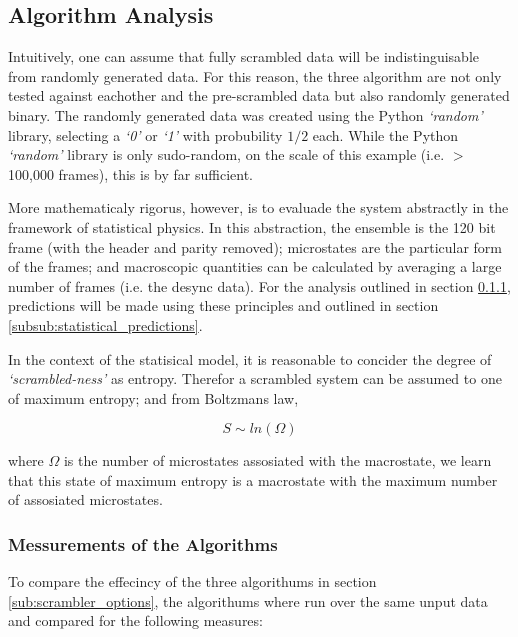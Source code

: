 	\subsection{Algorithm Analysis}

		Intuitively, one can assume that fully scrambled data will be indistinguisable from randomly generated data. 
		For this reason, the three algorithm are not only tested against eachother and the pre-scrambled data but also randomly generated binary.
		The randomly generated data was created using the Python \textit{`random'} library, selecting a \textit{`0'} or \textit{`1'} with probubility $1/2$ each.
		While the Python \textit{`random'} library is only sudo-random, on the scale of this example (i.e. $>$ 100,000 frames), this is by far sufficient.
		\par
		More mathematicaly rigorus, however, is to evaluade the system abstractly in the framework of statistical physics.
		In this abstraction, the ensemble is the 120 bit frame (with the header and parity removed); 
		microstates are the particular form of the frames;
		and macroscopic quantities can be calculated by averaging a large number of frames (i.e. the desync data).
		For the analysis outlined in section \ref{subsub:messurements_of_the_algorithms}, predictions will be made using these principles and outlined in section \ref{subsub:statistical_predictions}.
		\par
		In the context of the statisical model, it is reasonable to concider the degree of \textit{`scrambled-ness'} as entropy.
		Therefor a scrambled system can be assumed to one of maximum entropy; and from Boltzmans law,

		\begin{equation}
			S \sim ln(\Omega)
		\end{equation}

		where $\Omega$ is the number of microstates assosiated with the macrostate, we learn that this state of maximum entropy is a macrostate with the maximum number of assosiated microstates.

		\subsubsection{Messurements of the Algorithms} 
		\label{subsub:messurements_of_the_algorithms}

			To compare the effecincy of the three algorithums in section \ref{sub:scrambler_options}, the algorithums where run over the same unput data and compared for the following measures:

